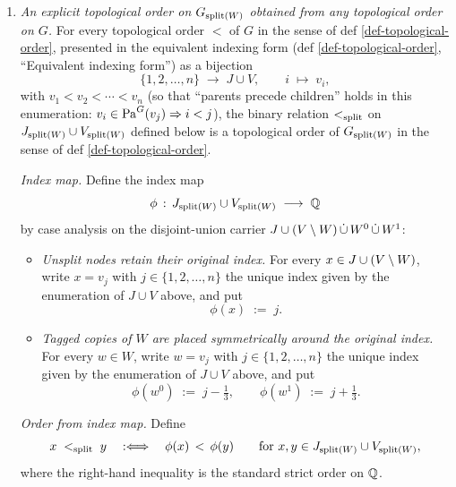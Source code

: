 \documentclass[main]{subfiles}
\begin{document}
\begin{Rem}[SplitTopologicalOrder]
\begin{enumerate}[label=(\alph*)]
        \item \emph{An explicit topological order on $G_{\mathrm{split}(W)}$ obtained from any topological order on $G$.}
              For every topological order $<$ of $G$ in the sense of def \ref{def-topological-order}, presented in the equivalent indexing form (def \ref{def-topological-order}, ``Equivalent indexing form'') as a bijection
              \[
                  \{1, 2, \dots, n\} \;\longrightarrow\; J \cup V, \qquad i \;\longmapsto\; v_i,
              \]
              with $v_1 < v_2 < \cdots < v_n$ (so that ``parents precede children'' holds in this enumeration: $v_i \in \mathrm{Pa}^G(v_j) \Rightarrow i < j$), the binary relation $<_{\mathrm{split}}$ on $J_{\mathrm{split}(W)} \cup V_{\mathrm{split}(W)}$ defined below is a topological order of $G_{\mathrm{split}(W)}$ in the sense of def \ref{def-topological-order}.

              \emph{Index map.}
              Define the index map
              \[ \phi \,:\, J_{\mathrm{split}(W)} \cup V_{\mathrm{split}(W)} \;\longrightarrow\; \mathbb{Q} \]
              by case analysis on the disjoint-union carrier $J \cup (V \setminus W) \,\dot{\cup}\, W^0 \,\dot{\cup}\, W^1$:
              \begin{itemize}
                  \item \emph{Unsplit nodes retain their original index.}
                        For every $x \in J \cup (V \setminus W)$, write $x = v_j$ with $j \in \{1, 2, \dots, n\}$ the unique index given by the enumeration of $J \cup V$ above, and put
                        \[ \phi(x) \;:=\; j. \]
                  \item \emph{Tagged copies of $W$ are placed symmetrically around the original index.}
                        For every $w \in W$, write $w = v_j$ with $j \in \{1, 2, \dots, n\}$ the unique index given by the enumeration of $J \cup V$ above, and put
                        \[
                            \phi(w^0) \;:=\; j - \tfrac{1}{3}, \qquad \phi(w^1) \;:=\; j + \tfrac{1}{3}.
                        \]
              \end{itemize}

              \emph{Order from index map.}
              Define
              \[
                  x \;<_{\mathrm{split}}\; y \quad :\Longleftrightarrow\quad \phi(x) \,<\, \phi(y) \qquad \text{for } x, y \in J_{\mathrm{split}(W)} \cup V_{\mathrm{split}(W)},
              \]
              where the right-hand inequality is the standard strict order on $\mathbb{Q}$.
    \end{enumerate}


\end{Rem}
\end{document}
